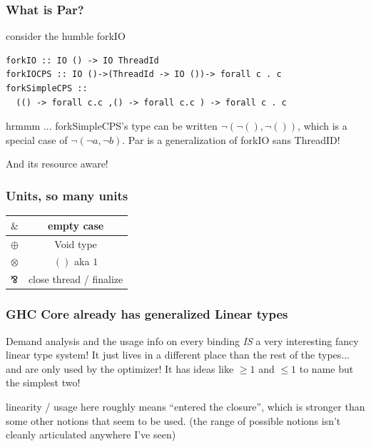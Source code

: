 \documentclass[11pt,reqno]{beamer}
\begin{document}
\begin{frame}[fragile]\frametitle{What is Par?}
consider the humble forkIO

\begin{verbatim}
forkIO :: IO () -> IO ThreadId
forkIOCPS :: IO ()->(ThreadId -> IO ())-> forall c . c
forkSimpleCPS ::
  (() -> forall c.c ,() -> forall c.c ) -> forall c . c
\end{verbatim}
hrmmm ... forkSimpleCPS's type can be written \( \neg (\neg (), \neg ()) \),
which is a special case of \( \neg (\neg a , \neg b) \). Par is a generalization of
forkIO sans ThreadID!

And its resource aware!

\end{frame}




\begin{frame}[fragile]\frametitle{Units, so many units}

\begin{tabular}{lc}
 \( \& \) & empty case \\ \hline
\( \oplus \) & Void type \\ \hline
\( \otimes \) & \( () \) aka \(1 \) \\ \hline
\( \invamp \) & close thread / finalize
\end{tabular}


\end{frame}

\begin{frame}\frametitle{GHC Core already has generalized Linear types}

Demand analysis and the usage info on every binding \emph{IS} a very interesting
fancy linear type system! It just lives in a different place than the rest of the
types... and are only used by the optimizer! It has ideas like \( \geq1 \) and \( \leq 1 \)
to name but the simplest two!

linearity / usage here roughly means ``entered the closure'', which is stronger
than some other notions that seem to be used.
(the range of possible notions isn't cleanly articulated anywhere I've seen)

\end{frame}



%

\end{document}
